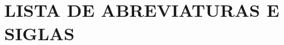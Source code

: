 \thispagestyle{empty}

\chapter*{\normalsize{\textbf{LISTA DE ABREVIATURAS E SIGLAS}}}


\begin{acronym}[]

\end{acronym}
